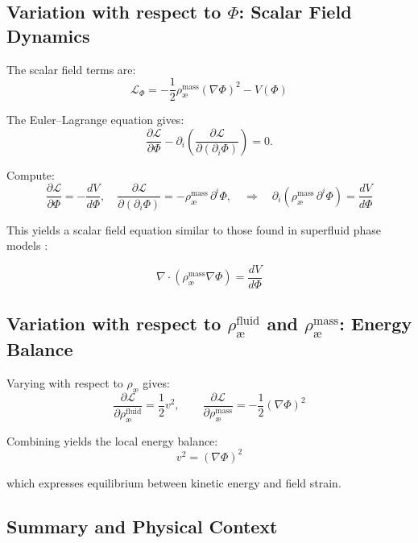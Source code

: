 \subsection*{Variation with respect to $\Phi$: Scalar Field Dynamics}

The scalar field terms are:
\[
    \mathcal{L}_\Phi = - \frac{1}{2} \rho_\text{\ae}^{\text{mass}} (\nabla \Phi)^2 - V(\Phi)
\]

The Euler--Lagrange equation gives:
\[
    \frac{\partial \mathcal{L}}{\partial \Phi} - \partial_i \left( \frac{\partial \mathcal{L}}{\partial (\partial_i \Phi)} \right) = 0.
\]

Compute:
\[
    \frac{\partial \mathcal{L}}{\partial \Phi} = -\frac{dV}{d\Phi}, \quad
   \frac{\partial \mathcal{L}}{\partial (\partial_i \Phi)} = - \rho_\text{\ae}^{\text{mass}}\, \partial^i \Phi,
    \quad \Rightarrow \quad
    \partial_i ( \rho_\text{\ae}^{\text{mass}}\, \partial^i \Phi ) = \frac{dV}{d\Phi}
\]

This yields a scalar field equation similar to those found in superfluid phase models \cite{khalatnikov2000}:

\begin{equation}
    \boxed{
        \nabla \cdot (\rho_\text{\ae}^{\text{mass}} \nabla \Phi) = \frac{dV}{d\Phi}
    }
\end{equation}

\subsection{Variation with respect to \(\rho_\text{\ae}^{\text{fluid}}\) and \(\rho_\text{\ae}^{\text{mass}}\): Energy Balance}

Varying with respect to \( \rho_\text{\ae} \) gives:
\[
    \frac{\partial \mathcal{L}}{\partial \rho_\text{\ae}^{\text{fluid}}} = \frac{1}{2} v^2,
    \qquad
    \frac{\partial \mathcal{L}}{\partial \rho_\text{\ae}^{\text{mass}}} = -\frac{1}{2} (\nabla \Phi)^2
\]

Combining yields the local energy balance:
\begin{equation}
    \boxed{
        v^2 = (\nabla \Phi)^2
    }
\end{equation}

which expresses equilibrium between kinetic energy and field strain.

\subsection*{Summary and Physical Context}

